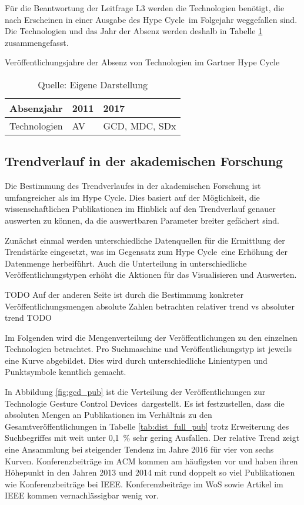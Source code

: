 Für die Beantwortung der Leitfrage L3 werden die Technologien benötigt, die nach Erscheinen in einer Ausgabe des \glqq Hype Cycle\grqq~im Folgejahr weggefallen sind. Die Technologien und das Jahr der Absenz werden deshalb in Tabelle \ref{tab:ghc_abscence} zusammengefasst.

\begin{table}
	\caption{Veröffentlichungsjahre der Absenz von Technologien im \glqq Gartner Hype Cycle\grqq}
	\selectfont
	\centering
	\label{tab:ghc_abscence}
	\begin{tabularx}{\linewidth}{X|X|X}
		Absenzjahr & 2011 & 2017  \\
		\hline
		Technologien & \acs{AV} & \acs{GCD}, \acs{MDC}, \acs{SDx} \\
	\end{tabularx}
	\caption*{Quelle: Eigene Darstellung}
\end{table}

\subsection{Trendverlauf in der akademischen Forschung}
Die Bestimmung des Trendverlaufes in der akademischen Forschung ist umfangreicher als im \glqq Hype Cycle\grqq. Dies basiert auf der Möglichkeit, die wissenschaftlichen Publikationen im Hinblick auf den Trendverlauf genauer auswerten zu können, da die auswertbaren Parameter breiter gefächert sind.

Zunächst einmal werden unterschiedliche Datenquellen für die Ermittlung der Trendstärke eingesetzt, was im Gegensatz zum \glqq Hype Cycle\grqq~eine Erhöhung der Datenmenge herbeiführt. Auch die Unterteilung in unterschiedliche Veröffentlichungstypen erhöht die Aktionen für das Visualisieren und Auswerten.

TODO
Auf der anderen Seite ist durch die Bestimmung konkreter Veröffentlichungsmengen 
absolute Zahlen betrachten
relativer trend vs absoluter trend
TODO

Im Folgenden wird die Mengenverteilung der Veröffentlichungen zu den einzelnen Technologien betrachtet. Pro Suchmaschine und Veröffentlichungstyp ist jeweils eine Kurve abgebildet. Dies wird durch unterschiedliche Linientypen und Punktsymbole kenntlich gemacht.

In Abbildung \ref{fig:gcd_pub} ist die Verteilung der Veröffentlichungen zur Technologie \glqq Gesture Control Devices\grqq~dargestellt. Es ist festzustellen, dass die absoluten Mengen an Publikationen im Verhältnis zu den Gesamtveröffentlichungen in Tabelle \ref{tab:dist_full_pub} trotz Erweiterung des Suchbegriffes mit weit unter 0,1~\% sehr gering Ausfallen. Der relative Trend zeigt eine Ansammlung bei steigender Tendenz im Jahre 2016 für vier von sechs Kurven. Konferenzbeiträge im \ac{ACM} kommen am häufigsten vor und haben ihren Höhepunkt in den Jahren 2013 und 2014 mit rund doppelt so viel Publikationen wie Konferenzbeiträge bei \ac{IEEE}. Konferenzbeiträge im \ac{WoS} sowie Artikel im \ac{IEEE} kommen vernachlässigbar wenig vor.

